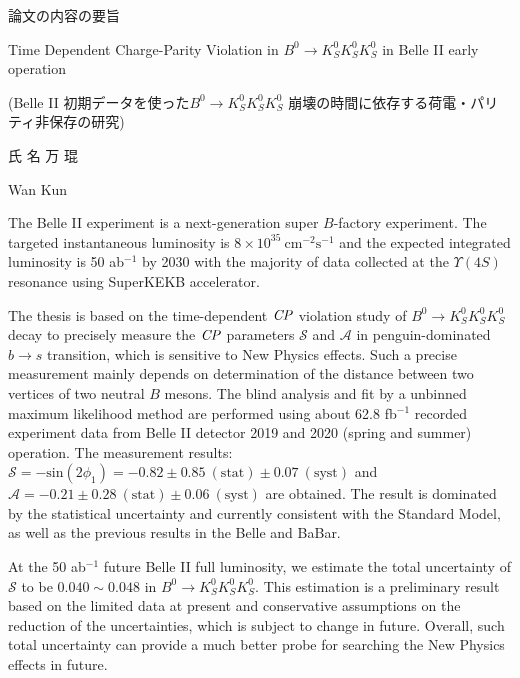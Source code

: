 \documentclass[10.5pt,twoside]{mitthesis}
\begin{document}
\begin{CJK}{UTF8}{min}
	\large
	\centering
	論文の内容の要旨\\
\end{CJK}

\begin{center}
	\large
	Time Dependent Charge-Parity Violation in $B^0 \to K^0_S K^0_S K^0_S $ in Belle II early operation\\
\end{center}
\begin{CJK}{UTF8}{min}
	\large
	\centering
	(Belle II 初期データを使った$B^0 \to K_S^0  K_S^0  K_S^0$ 崩壊の時間に依存する荷電・パリティ非保存の研究)\\
	\vspace{1cm}
\end{CJK}
\begin{CJK}{UTF8}{min}
	\large
	\centering
	氏 名 \space \space \space \space  万 琨\\
\end{CJK}
\begin{center}
	\large
	Wan Kun\\
\end{center}
\vspace{1cm}
The Belle II experiment is a next-generation super $B$-factory experiment. The targeted instantaneous luminosity is 
$8 \times 10^{35}~ \text{cm}^{-2}\text{s}^{-1}$ and the expected integrated luminosity is 50 ab$^{-1}$ by 2030 with the majority of data collected at the $\Upsilon(4S)$ resonance using SuperKEKB accelerator.

The thesis is based on the time-dependent $\it{CP}$ violation study of $B^0 \to K_S^0 K_S^0 K_S^0$ decay to precisely measure the $\it{CP}$ parameters $\mathcal{S}$ and $\mathcal{A}$ in penguin-dominated $b \to s$ transition, which is sensitive to New Physics effects. Such a precise measurement mainly depends on determination of the distance between two vertices of two neutral $B$ mesons. The blind analysis and fit by a unbinned maximum likelihood method are performed using about 62.8 fb$^{-1}$ recorded experiment data from Belle II detector 2019 and 2020 (spring and summer) operation. The measurement results: $\mathcal{S}= - \text{sin}(2\phi_1) = -0.82 \pm 0.85~(\text{stat}) \pm 0.07 ~(\text{syst})$ and $\mathcal{A}= -0.21 \pm 0.28 ~ (\text{stat}) \pm 0.06 ~ (\text{syst})$ are obtained. The result is dominated by the statistical uncertainty and currently consistent with the Standard Model, as well as the previous results in the Belle and BaBar. 

At the 50 ab$^{-1}$ future Belle II full luminosity, we estimate the total uncertainty of $\mathcal{S}$ to be $0.040\sim 0.048$ in $B^0 \to K_S^0  K_S^0  K_S^0$. This estimation is a preliminary result based on the limited data at present and conservative assumptions on the reduction of the uncertainties, which is subject to change in future. Overall, such total uncertainty can provide a much better probe for searching the New Physics effects in future.
\end{document}
